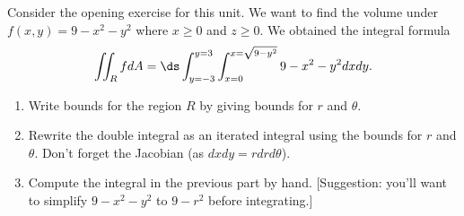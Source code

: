 \begin{problem}%
Consider the opening exercise for this unit.  We want to find the volume under $f(x,y)=9-x^2-y^2$ where $x\geq0$ and $z\geq 0$.  We obtained the integral formula 
$$\iint_R f dA = \ds\int_{y=-3}^{y=3} \int_{x=0}^{x=\sqrt{9-y^2}}9-x^2-y^2 dx dy.$$
\begin{enumerate}
 \item Write bounds for the region $R$ by giving bounds for $r$ and $\theta$.
 \item Rewrite the double integral as an iterated integral using the bounds for $r$ and $\theta$. Don't forget the Jacobian (as $dxdy=rdrd\theta$). 
 \item Compute the integral in the previous part by hand. [Suggestion: you'll want to simplify $9-x^2-y^2$ to $9-r^2$ before integrating.]
\end{enumerate}
\end{problem}



